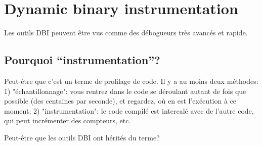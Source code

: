 \chapter{Dynamic binary instrumentation}

Les outils \ac{DBI} peuvent être vus comme des débogueurs très avancés et rapide.



\section{Pourquoi ``instrumentation''?}

Peut-être que c'est un terme de profilage de code.
Il y a au moins deux méthodes:
1) "échantillonnage": vous rentrez dans le code se déroulant autant de fois que possible
(des centaines par seconde), et regardez, où en est l'exécution à ce moment;
2) "instrumentation": le code compilé est intercalé avec de l'autre code, qui peut
incrémenter des compteurs, etc.

Peut-être que les outils \ac{DBI} ont hérités du terme?

